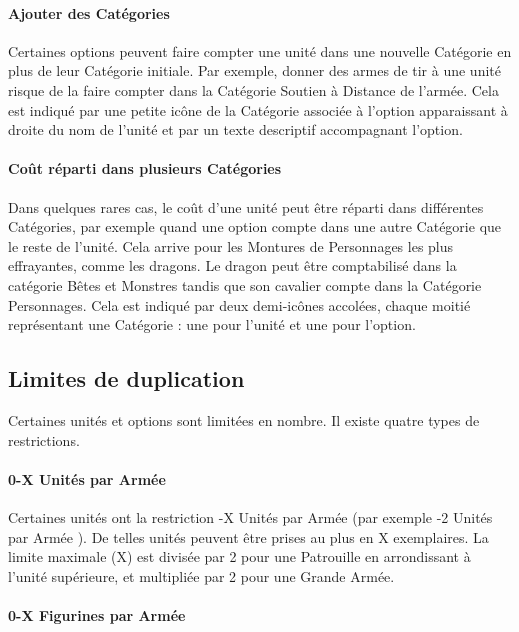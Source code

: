 \paragraph{Ajouter des Catégories}

Certaines options peuvent faire compter une unité dans une nouvelle Catégorie en plus de leur Catégorie initiale. Par exemple, donner des armes de tir à une unité risque de la faire compter dans la Catégorie \og Soutien à Distance \fg{} de l'armée. Cela est indiqué par une petite icône de la Catégorie associée à l'option apparaissant à droite du nom de l'unité et par un texte descriptif accompagnant l'option.

\paragraph{Coût réparti dans plusieurs Catégories}

Dans quelques rares cas, le coût d'une unité peut être réparti dans différentes Catégories, par exemple quand une option compte dans une autre Catégorie que le reste de l'unité. Cela arrive pour les Montures de Personnages les plus effrayantes, comme les dragons. Le dragon peut être comptabilisé dans la catégorie \og Bêtes et Monstres \fg{} tandis que son cavalier compte dans la Catégorie Personnages. Cela est indiqué par deux demi-icônes accolées, chaque moitié représentant une Catégorie : une pour l'unité et une pour l'option.

\subsection{Limites de duplication}

Certaines unités et options sont limitées en nombre. Il existe quatre types de restrictions.

\paragraph{0-X Unités par Armée}

Certaines unités ont la restriction -X Unités par Armée \fg{} (par exemple -2 Unités par Armée \fg{}). De telles unités peuvent être prises au plus en X exemplaires. La limite maximale (X) est divisée par 2 pour une Patrouille en arrondissant à l'unité supérieure, et multipliée par 2 pour une Grande Armée.

\paragraph{0-X Figurines par Armée}

